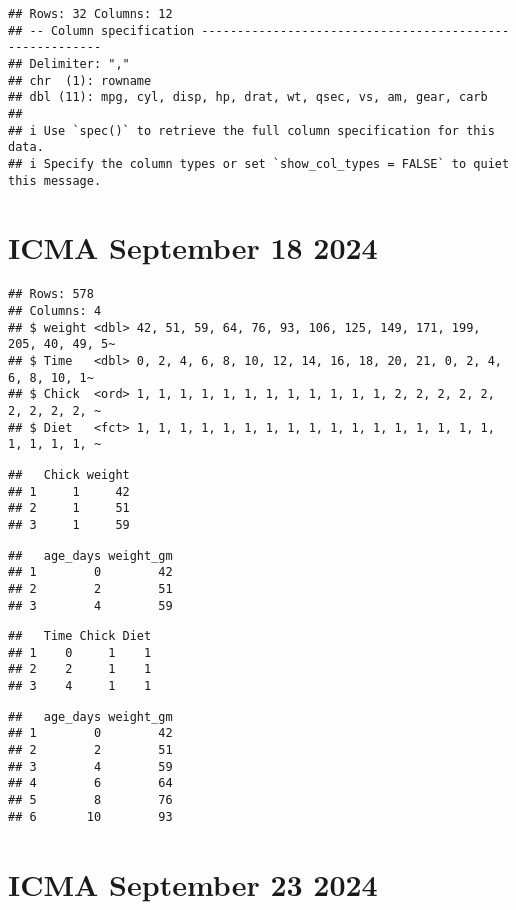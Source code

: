 \documentclass[
]{article}
\begin{document}
\begin{verbatim}
## Rows: 32 Columns: 12
## -- Column specification --------------------------------------------------------
## Delimiter: ","
## chr  (1): rowname
## dbl (11): mpg, cyl, disp, hp, drat, wt, qsec, vs, am, gear, carb
## 
## i Use `spec()` to retrieve the full column specification for this data.
## i Specify the column types or set `show_col_types = FALSE` to quiet this message.
\end{verbatim}

\section{ICMA September 18 2024}\label{icma-september-18-2024}

\begin{verbatim}
## Rows: 578
## Columns: 4
## $ weight <dbl> 42, 51, 59, 64, 76, 93, 106, 125, 149, 171, 199, 205, 40, 49, 5~
## $ Time   <dbl> 0, 2, 4, 6, 8, 10, 12, 14, 16, 18, 20, 21, 0, 2, 4, 6, 8, 10, 1~
## $ Chick  <ord> 1, 1, 1, 1, 1, 1, 1, 1, 1, 1, 1, 1, 2, 2, 2, 2, 2, 2, 2, 2, 2, ~
## $ Diet   <fct> 1, 1, 1, 1, 1, 1, 1, 1, 1, 1, 1, 1, 1, 1, 1, 1, 1, 1, 1, 1, 1, ~
\end{verbatim}

\begin{verbatim}
##   Chick weight
## 1     1     42
## 2     1     51
## 3     1     59
\end{verbatim}

\begin{verbatim}
##   age_days weight_gm
## 1        0        42
## 2        2        51
## 3        4        59
\end{verbatim}

\begin{verbatim}
##   Time Chick Diet
## 1    0     1    1
## 2    2     1    1
## 3    4     1    1
\end{verbatim}

\begin{verbatim}
##   age_days weight_gm
## 1        0        42
## 2        2        51
## 3        4        59
## 4        6        64
## 5        8        76
## 6       10        93
\end{verbatim}

\section{ICMA September 23 2024}\label{icma-september-23-2024}
\end{document}
